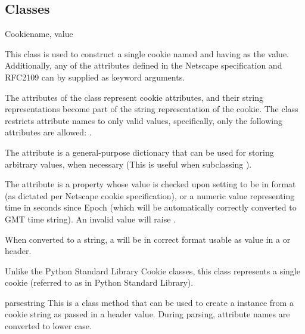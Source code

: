 \subsection{Classes\label{pyapi-cookie-classes}}

\begin{classdesc}{Cookie}{name, value}

  This class is used to construct a single cookie named 
  and having  as the value. Additionally, any of the 
  attributes defined in the Netscape specification and RFC2109 can by
  supplied as keyword arguments.

  The attributes of the class represent cookie attributes, and their
  string representations become part of the string representation of
  the cookie. The  class restricts attribute names to
  only valid values, specifically, only the following attributes are
  allowed: .

  The  attribute is a general-purpose dictionary that
  can be used for storing arbitrary values, when necessary (This is
  useful when subclassing ).

  The  attribute is a property whose value is checked
  upon setting to be in format 
  (as dictated per Netscape cookie specification), or a numeric value
  representing time in seconds since Epoch (which will be
  automatically correctly converted to GMT time string). An invalid
   value will raise .

  When converted to a string, a  will be in correct
  format usable as value in a  or 
  header.

  \begin{notice}
    Unlike the Python Standard Library Cookie classes, this
    class represents a single cookie (referred to as  in
    Python Standard Library).
  \end{notice}

  \begin{methoddesc}[Cookie]{parse}{string}
    This is a class method that can be used to create a 
    instance from a cookie string  as passed in a header
    value. During parsing, attribute names are converted to lower
    case.


\end{methoddesc}
\end{classdesc}
